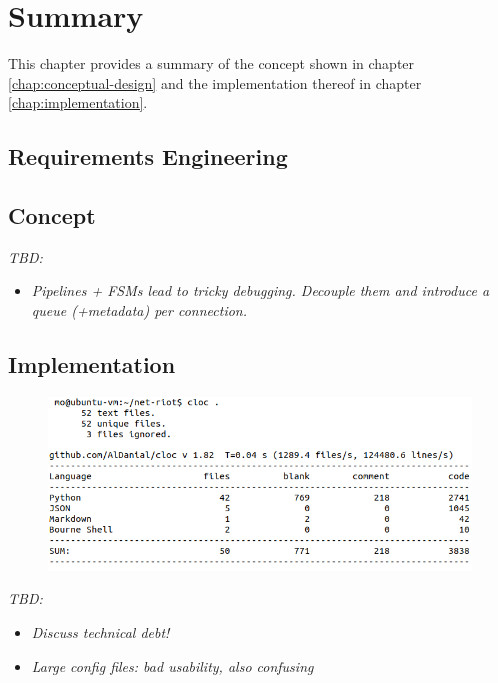 \chapter{Summary}
\label{chap:summary}
This chapter provides a summary of the concept shown in chapter \ref{chap:conceptual-design} and the implementation thereof in chapter \ref{chap:implementation}.

\section{Requirements Engineering}
\label{sec:summary-requirements-engineering}

\section{Concept}
\label{sec:summary-concept}
\emph{TBD:}
\begin{itemize}
    \item \emph{Pipelines + \acp{FSM} lead to tricky debugging. Decouple them and introduce a queue (+metadata) per connection.}
\end{itemize}

\section{Implementation}
\label{sec:summary-implementation}

\begin{figure}[h]
    \centering
    \includegraphics[width=12cm]{img/ch06/cloc.png}
    \label{fig:cloc}
\end{figure}
\emph{TBD:}
\begin{itemize}
    \item \emph{Discuss technical debt!}
    \item \emph{Large config files: bad usability, also confusing}
\end{itemize}